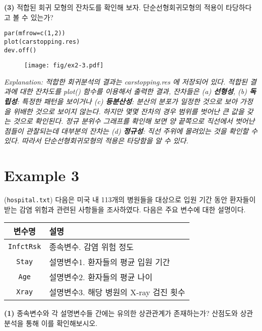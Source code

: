 \documentclass{article}
\begin{document}
\textbf{(3)} 적합된 회귀 모형의 잔차도를 확인해 보자. 단순선형회귀모형의 적용이 타당하다고 볼 수 있는가?

\begin{lstlisting}[style={r-style}]
par(mfrow=c(1,2))
plot(carstopping.res)
dev.off()
\end{lstlisting}
\begin{figure}[htb!]
    \centering
    \texttt{[image: fig/ex2-3.pdf]}
\end{figure}
\emph{Explanation: 적합한 회귀분석의 결과는 carstopping.res 에 저장되어 있다. 적합된 결과에 대한 잔차도를 plot() 함수를 이용해서 출력한 결과, 잔차들은 (a) \textbf{선형성}, (b) \textbf{독립성}: 특정한 패턴을 보이거나 (c) \textbf{등분산성}: 분산의 분포가 일정한 것으로 보아 가정을 위배한 것으로 보이지 않는다. 하지만 몇몇 잔차의 경우 범위를 벗어난 큰 값을 갖는 것으로 확인된다. 정규 분위수 그래프를 확인해 보면 양 끝쪽으로 직선에서 벗어난 점들이 관찰되는데 대부분의 잔차는 (d) \textbf{정규성}: 직선 주위에 몰려있는 것을 확인할 수 있다. 따라서 단순선형회귀모형의 적용은 타당함을 알 수 있다.} \\

\section*{Example 3}
(\texttt{hospital.txt}) 다음은 미국 내 113개의 병원들을 대상으로 입원 기간 동안 환자들이 받는 감염 위험과 관련된 사항들을 조사하였다. 다음은 주요 변수에 대한 설명이다. 
\begin{table}[htb!]
\centering
\begin{tabular}{|c|l|}
\hline
변수명 & 설명 \\ \hline
\texttt{InfctRsk} & 종속변수. 감염 위험 정도 \\ \hline
\texttt{Stay} & 설명변수1. 환자들의 평균 입원 기간 \\ \hline
\texttt{Age} & 설명변수2. 환자들의 평균 나이 \\ \hline
\texttt{Xray} & 설명변수3. 해당 병원의 X-ray 검진 횟수 \\ \hline
\end{tabular}
\end{table}

\textbf{(1)} 종속변수와 각 설명변수들 간에는 유의한 상관관계가 존재하는가? 산점도와 상관분석을
통해 이를 확인해보시오.
\end{document}
